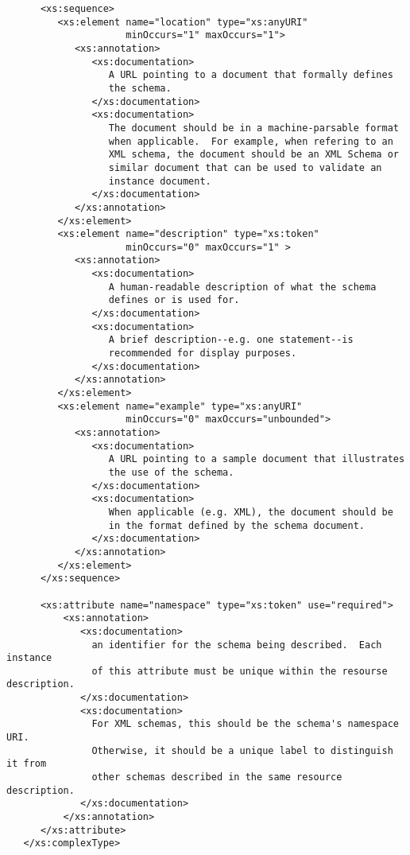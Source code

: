 \documentclass[11pt,a4paper]{ivoa}
\begin{document}
{{\begin{verbatim}
      <xs:sequence>
         <xs:element name="location" type="xs:anyURI" 
                     minOccurs="1" maxOccurs="1">
            <xs:annotation>
               <xs:documentation>
                  A URL pointing to a document that formally defines
                  the schema.
               </xs:documentation>
               <xs:documentation>
                  The document should be in a machine-parsable format
                  when applicable.  For example, when refering to an
                  XML schema, the document should be an XML Schema or 
                  similar document that can be used to validate an 
                  instance document.  
               </xs:documentation>
            </xs:annotation>
         </xs:element>
         <xs:element name="description" type="xs:token" 
                     minOccurs="0" maxOccurs="1" >
            <xs:annotation>
               <xs:documentation>
                  A human-readable description of what the schema
                  defines or is used for.
               </xs:documentation>
               <xs:documentation>
                  A brief description--e.g. one statement--is
                  recommended for display purposes.  
               </xs:documentation>
            </xs:annotation>
         </xs:element>
         <xs:element name="example" type="xs:anyURI" 
                     minOccurs="0" maxOccurs="unbounded">
            <xs:annotation>
               <xs:documentation>
                  A URL pointing to a sample document that illustrates 
                  the use of the schema.
               </xs:documentation>
               <xs:documentation>
                  When applicable (e.g. XML), the document should be
                  in the format defined by the schema document.
               </xs:documentation>
            </xs:annotation>
         </xs:element>
      </xs:sequence>

      <xs:attribute name="namespace" type="xs:token" use="required">
          <xs:annotation>
             <xs:documentation>
               an identifier for the schema being described.  Each instance 
               of this attribute must be unique within the resourse description.
             </xs:documentation>
             <xs:documentation>
               For XML schemas, this should be the schema's namespace URI.
               Otherwise, it should be a unique label to distinguish it from 
               other schemas described in the same resource description. 
             </xs:documentation>
          </xs:annotation>
      </xs:attribute>
   </xs:complexType>


\end{verbatim}}}
\end{document}
